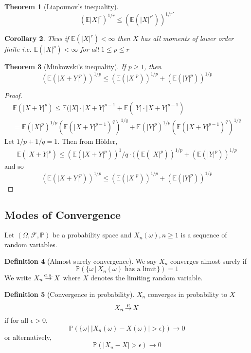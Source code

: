 \documentclass[10pt, oneside, reqno]{amsart}
\theoremstyle{plain}%
\newtheorem{thm}{Theorem}[section]
\newtheorem{cor}[thm]{Corollary}
\theoremstyle{definition}
\newtheorem{defn}[thm]{Definition}
\theoremstyle{remark}
\newcommand{\sigf}{\mathcal{F}}
\newcommand{\E}{\mathbb{E}}
\renewcommand{\P}{\mathbb{P}}
\def\cip{\,{\buildrel p \over \rightarrow}\,}
\def\cas{\,{\buildrel a.s. \over \rightarrow}\,}
\begin{document}
\begin{thm}[Liapounov's inequality]
    \[
        (\E|X|^r)^{1/r} \leq ( \E(|X|^{r'}))^{1/r'}
    \]
\end{thm}
\begin{cor}
    Thus if $\E(|X|^r) < \infty$ then $X$ has all moments of lower order finite i.e. $\E(|X|^p) < \infty$ for all $ 1 \leq p \leq r$
\end{cor}


\begin{thm}[Minkowski's inequality]
    If $p \geq 1$, then \[
        (\E(|X+Y|^p))^{1/p} \leq (\E(|X|^p))^{1/p} + (\E(|Y|^p))^{1/p}
    \]
\end{thm}
\begin{proof}
    \begin{align*}
        \E(|X+Y|^p) \leq \E(|X| \cdot |X+Y|^{p-1} + \E(|Y| \cdot |X+Y|^{p-1}) \\
                    = \E(|X|^p)^{1/p} ( \E(|X+Y|^{p-1})^q)^{1/q} + \E(|Y|^p)^{1/p} ( \E(|X+Y|^{p-1})^q)^{1/q}
    \end{align*}
    Let $1/p + 1/q = 1$.  Then from H\"older, 
    \begin{align*}
        \E(|X+Y|^p) \leq (\E(|X+Y|^p))^1/q \cdot ( (\E(|X|^p))^{1/p} + ( \E(|Y|^p))^{1/p}
    \end{align*}
    and so \[
        (\E(|X+Y|^p))^{1/p} \leq (\E(|X|^p))^{1/p} + (\E(|Y|^p))^{1/p}
    \]
\end{proof}

\subsection{Modes of Convergence} %
\label{sub:modes_of_convergence}
Let $(\Omega, \sigf, \P)$ be a probability space and $X_n(\omega), n \geq 1$ is a sequence of random variables.  

\begin{defn}[Almost surely convergence]
    We say $X_n$ converges almost surely if \[
        \P( \{ \omega \, | \, X_n(\omega) \text{ has a limit} \} ) = 1
    \]
    We write $X_n \cas X$ where $X$ denotes the limiting random variable.
\end{defn}

\begin{defn}[Convergence in probability]
    $X_n$ converges in probability to $X$ \[
        X_n \cip X
    \] if for all $\epsilon > 0$, \[
        \P( \{ \omega \, | \, |X_n(\omega) - X(\omega) | > \epsilon \} ) \rightarrow 0
    \]
    or alternatively,\[
        \P( |X_n - X| > \epsilon) \rightarrow 0
    \]
\end{defn}
\end{document}
